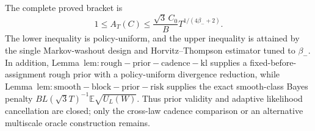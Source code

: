 The complete proved bracket is \[1\le A_T(C)\le \frac{\sqrt{3}\,C_0}{B}T^{1/(4\beta_-+2)}.\] The lower inequality is policy-uniform, and the upper inequality is attained by the single Markov-washout design and Horvitz--Thompson estimator tuned to \(\beta_-\). In addition, Lemma~\(\mathrm{lem:rough-prior-cadence-kl}\) supplies a fixed-before-assignment rough prior with a policy-uniform divergence reduction, while Lemma~\(\mathrm{lem:smooth-block-prior-risk}\) supplies the exact smooth-class Bayes penalty \(BL(\sqrt3 T)^{-1}\mathbb E\sqrt{U_L(W)}\). Thus prior validity and adaptive likelihood cancellation are closed; only the cross-law cadence comparison or an alternative multiscale oracle construction remains.